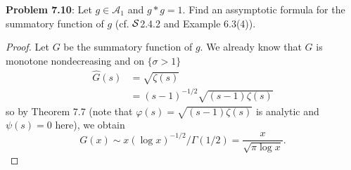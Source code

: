 \documentclass[12pt]{article}
\newcommand{\A}{\mathcal{A}}
\newcommand{\Ghat}{\widehat{G}}
\begin{document}
\fi

\textbf{Problem 7.10}: Let $g \in \A_1$ and $g * g = 1$. Find an assymptotic formula for the summatory function of $g$ (cf. $\S$2.4.2 and Example 6.3(4)).

\begin{proof}
Let $G$ be the summatory function of $g$. We already know that $G$ is monotone nondecreasing and on $\{\sigma > 1\}$
\begin{align*}
\Ghat(s) &= \sqrt{\zeta(s)} \\
&= (s - 1)^{-1/2} \sqrt{(s-1) \zeta(s)}
\end{align*}
so by Theorem 7.7 (note that $\varphi(s) = \sqrt{(s-1) \zeta(s)}$ is analytic and $\psi(s) = 0$ here), we obtain
$$G(x) \sim x (\log x)^{-1/2} / \Gamma(1/2) = \frac{x}{\sqrt{\pi \log x}}.$$
\end{proof}

\unless\ifdefined\IsMainDocument
\end{document}
